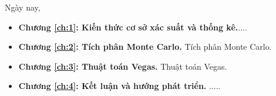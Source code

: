 \startintroduction
\fancyhead[L]{}
Ngày nay, \par
\clearpage 
\begin{itemize}
 \item \textbf{Chương \ref{ch:1}: Kiến thức cơ sở xác suất và thống kê.}....
 \item \textbf{Chương \ref{ch:2}: Tích phân Monte Carlo.} Tích phân Monte Carlo.
 \item \textbf{Chương \ref{ch:3}: Thuật toán Vegas.} Thuật toán Vegas.
 \item \textbf{Chương \ref{ch:4}: Kết luận và hướng phát triển.} .....
\end{itemize}
